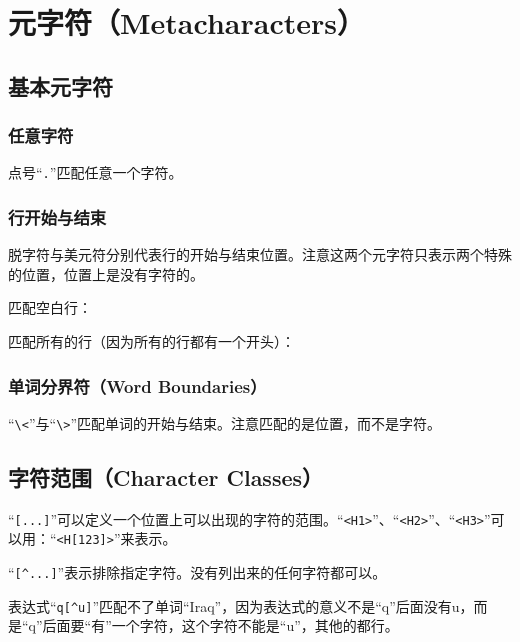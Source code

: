 
\chapter{元字符（Metacharacters）}

\section{基本元字符}

\subsection{任意字符}

点号“\verb|.|”匹配任意一个字符。

\subsection{行开始与结束}

脱字符与美元符分别代表行的开始与结束位置。注意这两个元字符只表示两个特殊的位置，位置上是没有字符的。


匹配空白行：


匹配所有的行（因为所有的行都有一个开头）：


\subsection{单词分界符（Word Boundaries）}

“\verb|\<|”与“\verb|\>|”匹配单词的开始与结束。注意匹配的是位置，而不是字符。







\section{字符范围（Character Classes）}

“\verb|[...]|”可以定义一个位置上可以出现的字符的范围。“\verb|<H1>|”、“\verb|<H2>|”、“\verb|<H3>|”可以用：“\verb|<H[123]>|”来表示。

“\verb|[^...]|”表示排除指定字符。没有列出来的任何字符都可以。

表达式“\verb|q[^u]|”匹配不了单词“Iraq”，因为表达式的意义不是“q”后面没有u，而是“q”后面要“有”一个字符，这个字符不能是“u”，其他的都行。

